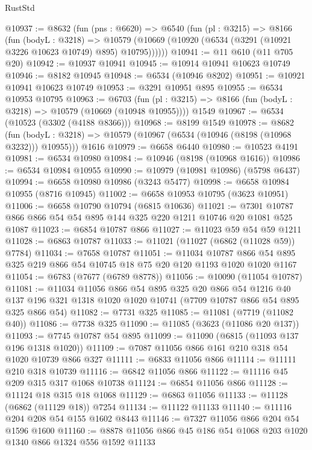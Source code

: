 \begin{lexlean}{RustStd}
\begin{coremodule}
@10937 := @8632
    (fun (pns : @6620) =>
    @6540
      (fun (pl : @3215) =>
      @8166
        (fun (bodyL : @3218) =>
        @10579 (@10669 (@10920 (@6534 (@3291 (@10921 @3226 @10623 @10749) @895) @10795))))))
@10941 := @11 @610 (@11 @705 @20)
@10942 := @10937 @10941
@10945 := @10914 @10941 @10623 @10749
@10946 := @8182 @10945
@10948 := @6534 (@10946 @8202)
@10951 := @10921 @10941 @10623 @10749
@10953 := @3291 @10951 @895
@10955 := @6534 @10953 @10795
@10963 := @6703
    (fun (pl : @3215) => @8166 (fun (bodyL : @3218) => @10579 (@10669 (@10948 @10955))))
    @1549
@10967 := @6534 (@10523 (@3302 (@4188 @8366)))
@10968 := @8199 @1549
@10978 := @8682
    (fun (bodyL : @3218) => @10579 (@10967 (@6534 (@10946 (@8198 (@10968 @3232))) @10955)))
    @1616
@10979 := @6658 @6440
@10980 := @10523 @4191
@10981 := @6534 @10980
@10984 := @10946 (@8198 (@10968 @1616))
@10986 := @6534 @10984 @10955
@10990 := @10979 (@10981 @10986) (@5798 @6437)
@10994 := @6658 @10980 @10986 (@3243 @5477)
@10998 := @6658 @10984 @10955 (@8716 @10945)
@11002 := @6658 @10953 @10795 (@3623 @10951)
@11006 := @6658 @10790 @10794 (@6815 @10636)
@11021 := @7301 @10787 @866 @866 @54 @54 @895 @144 @325 @220 @1211 @10746 @20 @1081 @525 @1087
@11023 := @6854 @10787 @866
@11027 := @11023 @59 @54 @59 @1211
@11028 := @6863 @10787
@11033 := @11021 (@11027 (@6862 (@11028 @59)) @7784)
@11034 := @7658 @10787
@11051 := @11034
    @10787
    @866
    @54
    @895
    @325
    @219
    @866
    @54
    @10745
    @18
    @75
    @20
    @120
    @1193
    @1020
    @1020
    @1167
@11054 := @6783 (@7677 (@6789 @8778))
@11056 := @10090 (@11054 @10787)
@11081 := @11034
    @11056
    @866
    @54
    @895
    @325
    @20
    @866
    @54
    @1216
    @40
    @137
    @196
    @321
    @1318
    @1020
    @1020
    @10741
    (@7709 @10787 @866 @54 @895 @325 @866 @54)
@11082 := @7731 @325
@11085 := @11081 (@7719 (@11082 @40))
@11086 := @7738 @325
@11090 := @11085 (@3623 (@11086 @20 @137))
@11093 := @7745 @10787 @54 @895
@11099 := @11090 (@6815 (@11093 @137 @196 @1318 @1020))
@11109 := @7087 @11056 @866 @161 @210 @318 @54 @1020 @10739 @866 @327
@11111 := @6833 @11056 @866
@11114 := @11111 @210 @318 @10739
@11116 := @6842 @11056 @866
@11122 := @11116 @45 @209 @315 @317 @1068 @10738
@11124 := @6854 @11056 @866
@11128 := @11124 @18 @315 @18 @1068
@11129 := @6863 @11056
@11133 := @11128 (@6862 (@11129 @18)) @7254
@11134 := @11122 @11133
@11140 := @11116 @204 @208 @54 @155 @1602 @8443
@11146 := @7327 @11056 @866 @204 @54 @1596 @1600
@11160 := @8878 @11056 @866 @45 @186 @54 @1068 @203 @1020 @1340 @866 @1324 @556 @1592 @11133

\end{coremodule}
\end{lexlean}
